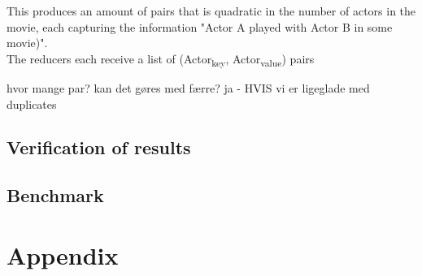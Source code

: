 \documentclass[a4paper,11pt]{article}
\begin{document}
This produces an amount of pairs that is quadratic in the number of actors in the movie, each capturing the information "Actor A played with Actor B in some movie)".\\

The reducers each receive a list of (Actor\textsubscript{key}, Actor\textsubscript{value}) pairs



	hvor mange par?
	kan det gøres med færre?
		ja - HVIS vi er ligeglade med duplicates

\subsection{Verification of results}
\subsection{Benchmark}

\section{Appendix}
\end{document}
